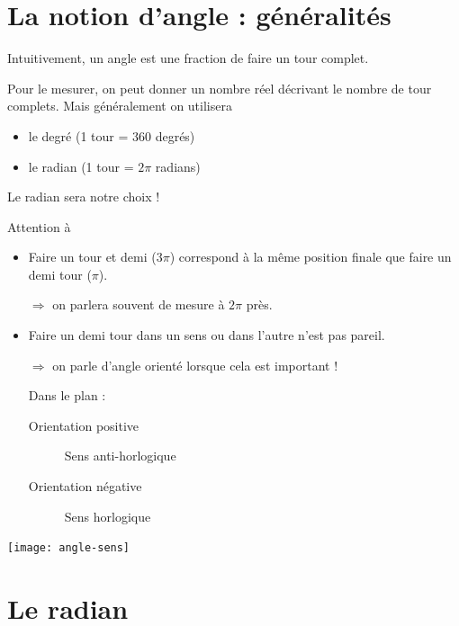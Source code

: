 \section{La notion d'angle : généralités}
\begin{frame}
Intuitivement, un angle est une fraction de \og faire un tour complet\fg{}.

Pour le mesurer, on peut donner un nombre réel décrivant le nombre de tour complets. Mais généralement on utilisera
\begin{itemize}
\item le degré (1 tour = \(360\) degrés) \pause
\item le radian (1 tour = \(2\pi\) radians)
\end{itemize}
Le radian sera notre choix !\pause
\end{frame}

\begin{frame}
  \begin{block}{Attention à}
    \begin{itemize}
    \item Faire un tour et demi (\(3\pi\)) correspond à la même position finale que faire un demi tour (\(\pi\)). \pause

      \(\Rightarrow\) on parlera souvent de mesure \og à \(2\pi\) près\fg{}.\pause
    \item Faire un demi tour dans un sens ou dans l'autre n'est pas pareil. \pause

      \(\Rightarrow\) on parle d'angle orienté lorsque cela est important !\pause

      Dans le plan :
      \begin{description}
      \item[Orientation positive] Sens anti-horlogique
      \item[Orientation négative] Sens horlogique
      \end{description}
    \end{itemize}
  \end{block}
\end{frame}

\begin{frame}
\begin{center}
  \texttt{[image: angle-sens]}
\end{center}
\end{frame}

\section{Le radian}\label{sec:leradian}

